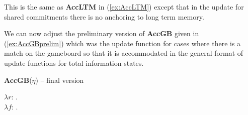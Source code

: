 This is the same as \textbf{AccLTM} in (\ref{ex:AccLTM}) except that
in the update for shared commitments 
there is no anchoring to long term memory.

We can now adjust the preliminary version of \textbf{AccGB} given in
(\ref{ex:AccGBprelim}) which was the update function for cases where there is a
match on the gameboard so that it is accommodated in the general format of update functions for
total information states.  %


\begin{ex} 
\textbf{AccGB}($\eta$) -- final version


\hspace*{-3em}$\lambda r$: . \\
\hspace*{-2em} $\lambda
f$:
              . \\
\hspace*{-1em} 
\end{ex}  

